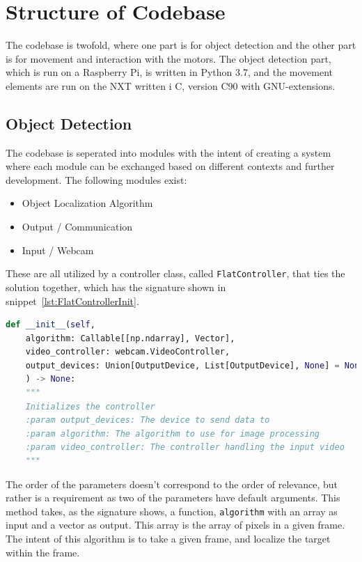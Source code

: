\section{Structure of Codebase}
The codebase is twofold, where one part is for object detection and the other part is for movement and interaction with the motors.
The object detection part, which is run on a Raspberry Pi, is written in Python 3{.}7, and the movement elements are run on the NXT written i C, version C90 with GNU-extensions.


\subsection{Object Detection}
The codebase is seperated into modules with the intent of creating a system where each module can be exchanged based on different contexts and further development.
The following modules exist:
\begin{itemize}
	\item Object Localization Algorithm
	\item Output / Communication
	\item Input / Webcam
\end{itemize}

These are all utilized by a controller class, called \texttt{FlatController}, that ties the solution together, which has the signature shown in snippet~\ref{lst:FlatControllerInit}.
\begin{lstlisting}[language=Python,label={lst:FlatControllerInit},caption={Initialization method of the \texttt{FlatController} class}]
def __init__(self,
	algorithm: Callable[[np.ndarray], Vector],
	video_controller: webcam.VideoController,
	output_devices: Union[OutputDevice, List[OutputDevice], None] = None,
	) -> None:
	"""
	Initializes the controller
	:param output_devices: The device to send data to
	:param algorithm: The algorithm to use for image processing
	:param video_controller: The controller handling the input video
	"""
\end{lstlisting}

The order of the parameters doesn't correspond to the order of relevance, but rather is a requirement as two of the parameters have default arguments.
This method takes, as the signature shows, a function, \texttt{algorithm} with an array as input and a vector as output.
This array is the array of pixels in a given frame.
The intent of this algorithm is to take a given frame, and localize the target within the frame.


